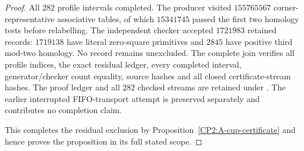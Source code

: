 \begin{proof}
All $282$ profile intervals completed.  The producer visited
$155765567$ corner-representative associative tables, of which
$15341745$ passed the first two homology tests before relabelling.
The independent checker accepted $1721983$ retained records:
$1719138$ have literal zero-square primitives and $2845$ have
positive third mod-two homology.  No record remains unexcluded.
The complete join  verifies
all profile indices, the exact residual ledger, every completed
interval, generator/checker count equality, source hashes and
all closed certificate-stream hashes.  The proof ledger and all
$282$ checked streams are retained under .
The earlier interrupted FIFO-transport attempt is preserved
separately and contributes no completion claim.

This completes the residual exclusion by
Proposition~\ref{CP2:A-cup-certificate} and hence proves
the proposition in its full stated scope.
\end{proof}
